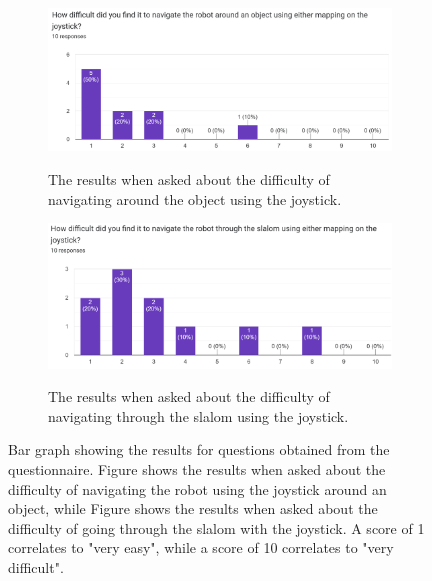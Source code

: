 \documentclass{l4proj}
\begin{document}
\begin{appendices}
\begin{figure}[!ht]
    \centering
    \begin{subfigure}{0.9\textwidth}
        \includegraphics[width=\textwidth]{images/joystick-object-difficulty.png}
        \label{fig:joystick-object-difficulty}
        \caption{The results when asked about the difficulty of navigating around the object using the joystick.}
    \end{subfigure}
    \begin{subfigure}{0.9\textwidth}
        \includegraphics[width=\textwidth]{images/joystick-slalom-difficulty.png}
        \label{fig:joystick-slalom-difficulty}
        \caption{The results when asked about the difficulty of navigating through the slalom using the joystick.}
    \end{subfigure}
    \caption{Bar graph showing the results for questions obtained from the questionnaire. Figure  shows the results when asked about the difficulty of navigating the robot using the joystick around an object, while Figure  shows the results when asked about the difficulty of going through the slalom with the joystick. A score of 1 correlates to "very easy", while a score of 10 correlates to "very difficult".}
    \label{fig:manual-difficulty}
\end{figure}



\end{appendices}
\end{document}
